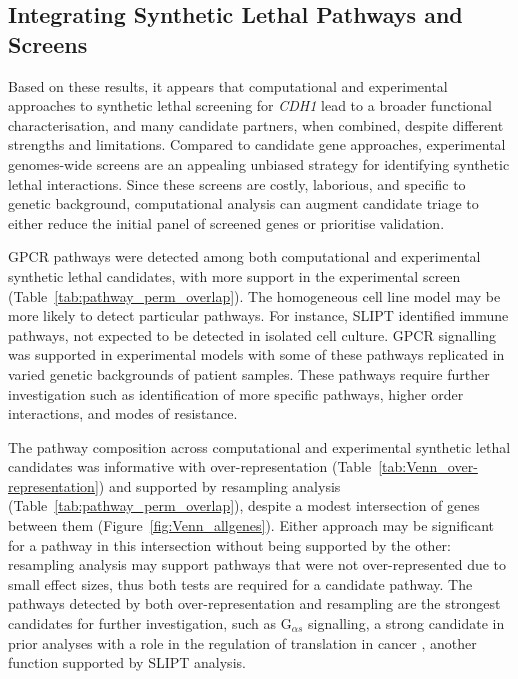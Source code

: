\subsection{Integrating Synthetic Lethal Pathways and Screens}

Based on these results, it appears that computational and experimental approaches to \gls{synthetic lethal} screening for \textit{CDH1} lead to a broader functional characterisation, and many candidate partners, when combined, despite different strengths and limitations. Compared to candidate gene approaches, experimental \glspl{genome}-wide screens are an appealing unbiased strategy for identifying \gls{synthetic lethal} interactions. Since these screens are costly, laborious, and specific to genetic background, computational analysis can augment candidate triage to either reduce the initial panel of screened genes or prioritise validation.

\gls{GPCR} pathways were detected among both computational and experimental \gls{synthetic lethal} candidates, with more support in the experimental screen (Table~\ref{tab:pathway_perm_overlap}). The homogeneous cell line model may be more likely to detect particular pathways. For instance, \gls{SLIPT} identified immune pathways, not expected to be detected in isolated cell culture. \gls{GPCR} signalling was supported in experimental models \cite{Telford2015} with some of these pathways replicated in varied genetic backgrounds of patient samples. These pathways require further investigation such as identification of more specific pathways, higher order interactions, and modes of resistance.

The pathway composition across computational and experimental \gls{synthetic lethal} candidates was informative with over-represent\-ation (Table~\ref{tab:Venn_over-representation}) and supported by resampling analysis (Table~\ref{tab:pathway_perm_overlap}), despite a modest intersection of genes between them (Figure~\ref{fig:Venn_allgenes}).
Either approach may be significant for a pathway in this intersection without being supported by the other: resampling analysis may support pathways that were not over-represent\-ed due to small effect sizes, thus both tests are required for a candidate pathway.
The pathways detected by both over-represent\-ation and resampling are the strongest candidates for further investigation, such as G$_{\alpha s}$ signalling, a strong candidate in prior analyses with a role in the regulation of translation in cancer \cite{Gao2015}, another function supported by \gls{SLIPT} analysis.

